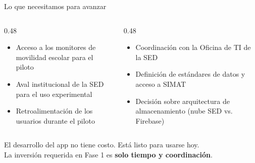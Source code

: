 \documentclass[aspectratio=169, 12pt]{beamer}
\begin{document}
\begin{frame}{Lo que necesitamos para avanzar}
\vspace{0.3cm}
\begin{columns}[T]
  \begin{column}{0.48\textwidth}
    \begin{tcolorbox}[colback=white, colframe=verde, arc=10pt,
      boxrule=2pt, title={\color{white}\bfseries Para el piloto (Fase 1)},
      coltitle=white, colbacktitle=verde]
      \begin{itemize}\setlength\itemsep{5pt}
        \item Acceso a los monitores de movilidad escolar para el piloto
        \item Aval institucional de la SED para el uso experimental
        \item Retroalimentación de los usuarios durante el piloto
      \end{itemize}
    \end{tcolorbox}
  \end{column}
  \begin{column}{0.48\textwidth}
    \begin{tcolorbox}[colback=white, colframe=azul, arc=10pt,
      boxrule=2pt, title={\color{white}\bfseries Para la integración (Fase 2)},
      coltitle=white, colbacktitle=azul]
      \begin{itemize}\setlength\itemsep{5pt}
        \item Coordinación con la Oficina de TI de la SED
        \item Definición de estándares de datos y acceso a SIMAT
        \item Decisión sobre arquitectura de almacenamiento (nube SED vs. Firebase)
      \end{itemize}
    \end{tcolorbox}
  \end{column}
\end{columns}
\vspace{0.35cm}
\begin{center}
  \textcolor{textgray}{\small El desarrollo del app no tiene costo.
  Está listo para usarse hoy.\\
  La inversión requerida en Fase 1 es \textbf{solo tiempo y coordinación}.}
\end{center}
\end{frame}
\end{document}
